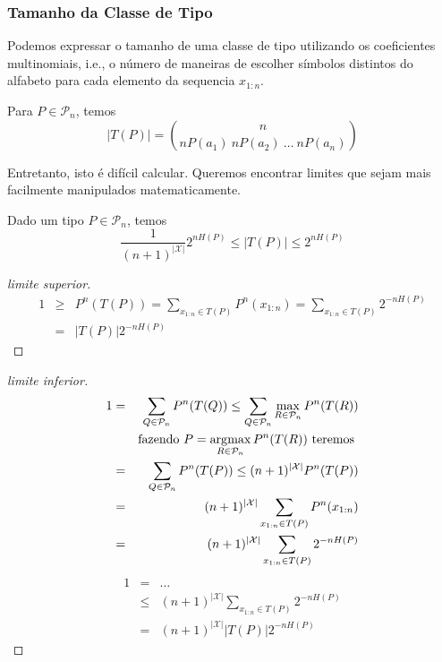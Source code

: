 \begin{frame}[allowframebreaks]
  \frametitle{Tamanho da Classe de Tipo}
  Podemos expressar o tamanho de uma classe de tipo utilizando os coeficientes multinomiais,
  i.e., o número de maneiras de escolher símbolos distintos do alfabeto para cada elemento
  da sequencia $x_{1:n}$. 

  Para $P \in \mathcal{P}_n$, temos
  \begin{equation}
  \vert T(P) \vert = { n \choose nP(a_1) \ nP(a_2) \ \ldots \ nP(a_n) }
  \end{equation}

  Entretanto, isto é difícil calcular. Queremos encontrar limites que sejam mais facilmente manipulados matematicamente.

  \framebreak

  \begin{theorem}
  Dado um tipo $P \in \mathcal{P}_n$, temos
	\begin{equation}
	\frac{1}{(n+1)^{\vert \mathcal{X} \vert}} 2^{nH(P)} \leq \vert T(P) \vert \leq 2^{nH(P)}
	\end{equation}
  \end{theorem}
 
  \begin{proof}[limite superior]
  \begin{eqnarray}
  1 &\geq& P^{n} (T(P)) = \sum_{x_{1:n} \in T(P)} P^{n} (x_{1:n}) = \sum_{x_{1:n} \in T(P)} 2^{-nH(P)} \nonumber \\
    &=& \vert T(P) \vert 2^{-nH(P)}
  \end{eqnarray}
  \end{proof}

  \framebreak

  \begin{proof}[limite inferior]
  \begin{eqnarray}
  1 &=& \sum_{Q \in \mathcal{P}_n} P^n (T(Q)) \leq \sum_{Q \in \mathcal{P}_n} \max_{R \in \mathcal{P}_n} P^n (T(R)) \nonumber \\
	 && \text{fazendo } P = \operatorname*{\arg\!\max}_{R \in \mathcal{P}_n} P^n (T(R)) \text{ teremos } \nonumber \\
	&=& \sum_{Q \in \mathcal{P}_n} P^n (T(P)) \leq (n+1)^{\vert \mathcal{X} \vert} P^n (T(P)) \nonumber \\
	&=& (n+1)^{\vert \mathcal{X} \vert} \sum_{x_{1:n} \in T(P)} P^n (x_{1:n}) \nonumber \\
	&=& (n+1)^{\vert \mathcal{X} \vert} \sum_{x_{1:n} \in T(P)} 2^{-nH(P)} 
  \end{eqnarray} 
  \proofbreak
  \begin{eqnarray}
  1 &=& \ldots \nonumber \\
	&\leq& (n+1)^{\vert \mathcal{X} \vert} \sum_{x_{1:n} \in T(P)} 2^{-nH(P)} \nonumber \\
	&=& (n+1)^{\vert \mathcal{X} \vert} \vert T(P) \vert 2^{-nH(P)}
  \end{eqnarray}
 

\end{proof}
\end{frame}
